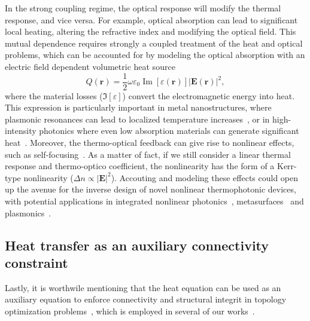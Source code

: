 In the strong coupling regime, the optical response will modify the thermal response, and vice versa.
For example, optical absorption can lead to significant local heating, altering the refractive index and modifying the optical field. 
This mutual dependence requires strongly a coupled treatment of the heat and optical problems, 
which can be accounted for by modeling the optical absorption with an electric field dependent volumetric heat source~\cite{plasm_heat_source}
\[
Q(\mathbf{r}) = \frac{1}{2} \omega \varepsilon_0 \operatorname{Im}[\varepsilon(\mathbf{r})] |\mathbf{E}(\mathbf{r})|^2,
\]
where the material losses ($\Im[\varepsilon]$) convert the electromagnetic energy into heat. 
This expression is particularly important in metal nanostructures, where plasmonic resonances can lead to localized temperature increases~\cite{plasm_heat_source}, or in 
high-intensity photonics where even low absorption materials can generate significant heat~\cite{thermal_nl, high_I_T}. Moreover, the thermo-optical feedback can give rise to nonlinear effects, such as self-focusing~\cite{thermal_nl}. As a matter of fact, if we still consider a linear
thermal response and thermo-optico coefficient,
the nonlinearity has the form of a Kerr-type nonlinearity ($\Delta n \propto \vert \mathbf{E} \vert^2$). Accouting and modeling
these effects could open up the avenue for the inverse design of novel nonlinear thermophotonic devices, with potential applications
in integrated nonlinear photonics~\cite{nl_photonics}, metasurfaces~\cite{nl_meta} and plasmonics~\cite{novotny}.


\subsection*{Heat transfer as an auxiliary connectivity constraint}

Lastly, it is worthwile mentioning that the heat equation can be used as an auxiliary equation to enforce connectivity
and structural integrit in topology optimization problems~\cite{vanessa, structural_heat}, which is employed in several of our
works~\cite{ownpub1,ownpub2}. 

